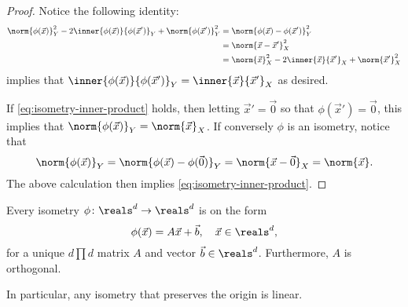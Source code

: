 \documentclass[article, a4paper, 11pt, oneside]{memoir}
\numberwithin{equation}{chapter}
\begin{document}
\begin{proof}
    Notice the following identity:
    \begin{align*}
        \norm{\phi(\vec{x})}_Y^2 - 2 \inner{\phi(\vec{x})}{\phi(\vec{x}')}_Y + \norm{\phi(\vec{x}')}_Y^2
            &= \norm{\phi(\vec{x}) - \phi(\vec{x}')}_Y^2 \\
            &= \norm{\vec{x} - \vec{x}'}_X^2 \\
            &= \norm{\vec{x}}_X^2 - 2 \inner{\vec{x}}{\vec{x}'}_X + \norm{\vec{x}'}_X^2
    \end{align*}
    implies that $\inner{\phi(\vec{x})}{\phi(\vec{x}')}_Y = \inner{\vec{x}}{\vec{x}'}_X$ as desired.

    If \cref{eq:isometry-inner-product} holds, then letting $\vec{x}' = \vec{0}$ so that $\phi(\vec{x}') = \vec{0}$, this implies that $\norm{\phi(\vec{x})}_Y = \norm{\vec{x}}_X$. If conversely $\phi$ is an isometry, notice that
    \begin{equation*}
        \norm{\phi(\vec{x})}_Y
            = \norm{\phi(\vec{x}) - \phi(\vec{0})}_Y
            = \norm{\vec{x} - \vec{0}}_X
            = \norm{\vec{x}}.
    \end{equation*}
    The above calculation then implies \cref{eq:isometry-inner-product}.
\end{proof}

\begin{proposition}
    \label{prop:isometry-characterisation-Euclidean-space}
    Every isometry $\phi \colon \reals^d \to \reals^d$ is on the form
    \begin{equation*}
        \phi(\vec{x})
            = A \vec{x} + \vec{b}, \quad \vec{x} \in \reals^d,
    \end{equation*}
    for a unique $d \prod d$ matrix $A$ and vector $\vec{b} \in \reals^d$. Furthermore, $A$ is orthogonal.
\end{proposition}
%
In particular, any isometry that preserves the origin is linear.
\end{document}
